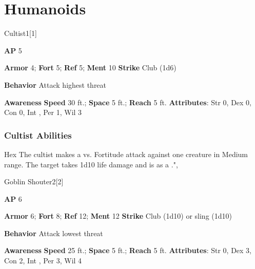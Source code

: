 \section{Humanoids}
\begin{monsection}{Cultist}{1}[1]
\vspace{-1em}\vspace{-1em}
\begin{spellcontent}
\begin{spelltargetinginfo}
{\textbf{AP} 5}

\pari \textbf{Armor} 4;
\textbf{Fort} 5;
\textbf{Ref} 5;
\textbf{Ment} 10
\pari \textbf{Strike} Club  (1d6)



\pari \textbf{Behavior} Attack highest threat
\end{spelltargetinginfo}
\end{spellcontent}

\begin{monsterfooter}
\pari \textbf{Awareness} 
\pari \textbf{Speed} 30 ft.;
\textbf{Space} 5 ft.;
\textbf{Reach} 5 ft.
\pari \textbf{Attributes}:
Str 0,
Dex 0,
Con 0,
Int ,
Per 1,
Wil 3
\end{monsterfooter}
\end{monsection}


\subsubsection{Cultist Abilities}

\begin{freeability}{Hex}
The cultist makes a  vs. Fortitude attack against one creature in Medium range.
\hit The target takes 1d10 life damage and is  as a .",
\end{freeability}

\begin{monsection}{Goblin Shouter}{2}[2]
\vspace{-1em}\vspace{-1em}
\begin{spellcontent}
\begin{spelltargetinginfo}
{\textbf{AP} 6}

\pari \textbf{Armor} 6;
\textbf{Fort} 8;
\textbf{Ref} 12;
\textbf{Ment} 12
\pari \textbf{Strike} Club  (1d10) or sling  (1d10)



\pari \textbf{Behavior} Attack lowest threat
\end{spelltargetinginfo}
\end{spellcontent}

\begin{monsterfooter}
\pari \textbf{Awareness} 
\pari \textbf{Speed} 25 ft.;
\textbf{Space} 5 ft.;
\textbf{Reach} 5 ft.
\pari \textbf{Attributes}:
Str 0,
Dex 3,
Con 2,
Int ,
Per 3,
Wil 4
\end{monsterfooter}
\end{monsection}


